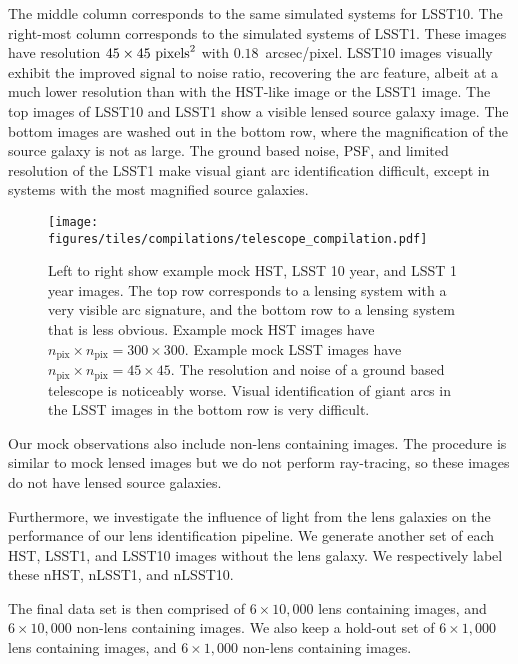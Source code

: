 \documentclass{emulateapj}
\begin{document}
The middle column corresponds to the same simulated systems for
LSST10.  The right-most column corresponds to the simulated systems of
LSST1.  These images have resolution $45\times45~{\rm pixels}^2$ with
$0.18$~arcsec/pixel.  LSST10 images visually exhibit the improved
signal to noise ratio, recovering the arc feature, albeit at a much
lower resolution than with the HST-like image or the LSST1 image.  The
top images of LSST10 and LSST1 show a visible lensed source galaxy
image.  The bottom images are washed out in the bottom row, where the
magnification of the source galaxy is not as large.  The ground based
noise, PSF, and limited resolution of the LSST1 make visual giant arc
identification difficult, except in systems with the most magnified
source galaxies.

\begin{figure*}[t]\label{fig:mockimages}
\begin{center}
\texttt{[image: figures/tiles/compilations/telescope\_compilation.pdf]}
\caption{Left to right show example mock HST, LSST 10 year, and LSST 1
  year images.  The top row corresponds to a lensing system with a
  very visible arc signature, and the bottom row to a lensing system
  that is less obvious.  Example mock HST images have
  $n_\text{pix}\times n_\text{pix}=300\times300$.  Example mock LSST
  images have $n_\text{pix}\times n_\text{pix}=45\times45$.  The
  resolution and noise of a ground based telescope is noticeably
  worse. Visual identification of giant arcs in the LSST images in the
  bottom row is very difficult.}
\end{center}
\end{figure*}

Our mock observations also include non-lens containing images.  The
procedure is similar to mock lensed images but we do not perform
ray-tracing, so these images do not have lensed source galaxies.  

Furthermore, we investigate the influence of light from the lens
galaxies on the performance of our lens identification pipeline.  We
generate another set of each HST, LSST1, and LSST10 images without the
lens galaxy.  We respectively label these nHST, nLSST1, and nLSST10.

The final data set is then comprised of $6\times10,000$ lens
containing images, and $6\times 10,000$ non-lens containing images.
We also keep a hold-out set of $6\times 1,000$ lens containing images,
and $6\times 1,000$ non-lens containing images.
\end{document}
